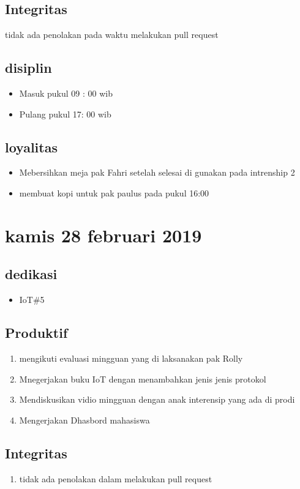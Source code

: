 \subsection{Integritas}
tidak ada penolakan pada waktu melakukan pull request
\subsection{disiplin}
\begin{itemize}
  \item Masuk pukul 09 : 00 wib
  \item Pulang pukul 17: 00 wib
\end{itemize}
\subsection{loyalitas}
\begin{itemize}
  \item Mebersihkan meja pak Fahri setelah selesai di gunakan pada intrenship 2
  \item membuat kopi untuk pak paulus pada pukul 16:00
\end{itemize}

\section{kamis 28 februari 2019}
\subsection{dedikasi}
\begin{itemize}
  \item IoT\#5
\end{itemize}
\subsection{Produktif}
\begin{enumerate}
  \item mengikuti evaluasi mingguan yang di laksanakan pak Rolly
  \item Mnegerjakan buku IoT dengan menambahkan jenis jenis protokol
  \item Mendiskusikan vidio mingguan dengan anak interensip yang ada di prodi
  \item Mengerjakan Dhasbord mahasiswa
\end{enumerate}
\subsection{Integritas}
\begin{enumerate}
  \item tidak ada penolakan dalam melakukan pull request
\end{enumerate}
